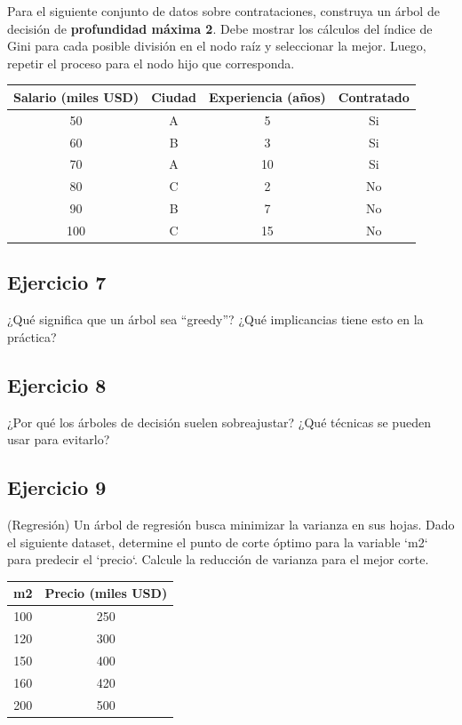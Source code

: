 \documentclass[12pt]{article}
\begin{document}
Para el siguiente conjunto de datos sobre contrataciones, construya un árbol de decisión de \textbf{profundidad máxima 2}. Debe mostrar los cálculos del índice de Gini para cada posible división en el nodo raíz y seleccionar la mejor. Luego, repetir el proceso para el nodo hijo que corresponda.
    \begin{center}
    \begin{tabular}{cccc}
    \toprule
    Salario (miles USD) & Ciudad & Experiencia (años) & Contratado \\
    \midrule
    50 & A & 5 & Si \\
    60 & B & 3 & Si \\
    70 & A & 10 & Si \\
    80 & C & 2 & No \\
    90 & B & 7 & No \\
    100 & C & 15 & No \\
    \bottomrule
    \end{tabular}
    \end{center}

\subsection{Ejercicio 7}

¿Qué significa que un árbol sea ``greedy''? ¿Qué implicancias tiene esto en la práctica?

\subsection{Ejercicio 8}

¿Por qué los árboles de decisión suelen sobreajustar? ¿Qué técnicas se pueden usar para evitarlo?

\subsection{Ejercicio 9}

(Regresión) Un árbol de regresión busca minimizar la varianza en sus hojas. Dado el siguiente dataset, determine el punto de corte óptimo para la variable `m2` para predecir el `precio`. Calcule la reducción de varianza para el mejor corte.
    \begin{center}
    \begin{tabular}{cc}
    \toprule
    m2 & Precio (miles USD) \\
    \midrule
    100 & 250 \\
    120 & 300 \\
    150 & 400 \\
    160 & 420 \\
    200 & 500 \\
    \bottomrule
    \end{tabular}
    \end{center}
\end{document}
